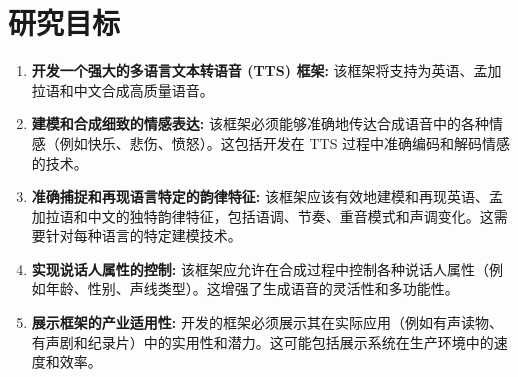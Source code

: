 \section*{研究目标}

\begin{enumerate}
    \parsep=20pt
    \item \textbf{开发一个强大的多语言文本转语音 (TTS) 框架:}  该框架将支持为英语、孟加拉语和中文合成高质量语音。
    \item \textbf{建模和合成细致的情感表达:} 该框架必须能够准确地传达合成语音中的各种情感（例如快乐、悲伤、愤怒）。这包括开发在 TTS 过程中准确编码和解码情感的技术。
    \item \textbf{准确捕捉和再现语言特定的韵律特征:} 该框架应该有效地建模和再现英语、孟加拉语和中文的独特韵律特征，包括语调、节奏、重音模式和声调变化。这需要针对每种语言的特定建模技术。
    \item \textbf{实现说话人属性的控制:} 该框架应允许在合成过程中控制各种说话人属性（例如年龄、性别、声线类型）。这增强了生成语音的灵活性和多功能性。
    \item \textbf{展示框架的产业适用性:} 开发的框架必须展示其在实际应用（例如有声读物、有声剧和纪录片）中的实用性和潜力。这可能包括展示系统在生产环境中的速度和效率。
\end{enumerate}